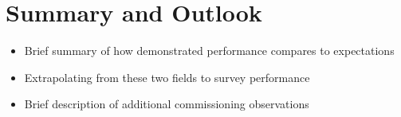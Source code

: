 










\section{Summary and Outlook}

\begin{itemize}

\item Brief summary of how demonstrated performance compares to expectations

\item Extrapolating from these two fields to survey performance

\item Brief description of additional commissioning observations 

\end{itemize}
